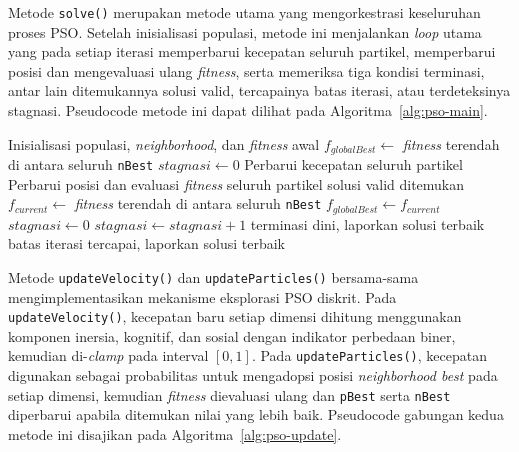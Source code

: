 Metode \texttt{solve()} merupakan metode utama yang mengorkestrasi keseluruhan proses PSO. Setelah inisialisasi populasi, metode ini menjalankan \textit{loop} utama yang pada setiap iterasi memperbarui kecepatan seluruh partikel, memperbarui posisi dan mengevaluasi ulang \textit{fitness}, serta memeriksa tiga kondisi terminasi, antar lain ditemukannya solusi valid, tercapainya batas iterasi, atau terdeteksinya stagnasi. Pseudocode metode ini dapat dilihat pada Algoritma~\ref{alg:pso-main}.

\begin{algorithm}[!htbp]
	\caption{Prosedur \texttt{solve} pada kelas \texttt{PSOSolver}}
	\label{alg:pso-main}
	\begin{algorithmic}[1]
		\State Inisialisasi populasi, \textit{neighborhood}, dan \textit{fitness} awal
		\State $f_{\textit{globalBest}} \gets$ \textit{fitness} terendah di antara seluruh \texttt{nBest}
		\State $stagnasi \gets 0$
		\State Perbarui kecepatan seluruh partikel
		\State Perbarui posisi dan evaluasi \textit{fitness} seluruh partikel
		\State \Return solusi valid ditemukan
		\EndIf
		\State $f_{\textit{current}} \gets$ \textit{fitness} terendah di antara seluruh \texttt{nBest}
		\State $f_{\textit{globalBest}} \gets f_{\textit{current}}$
		\State $stagnasi \gets 0$
		\Else
		\State $stagnasi \gets stagnasi + 1$
		\EndIf
		\State \Return terminasi dini, laporkan solusi terbaik
		\EndIf
		\EndFor
		\State \Return batas iterasi tercapai, laporkan solusi terbaik
		\EndFunction
	\end{algorithmic}
\end{algorithm}

Metode \texttt{updateVelocity()} dan \texttt{updateParticles()} bersama-sama mengimplementasikan mekanisme eksplorasi PSO diskrit. Pada \texttt{updateVelocity()}, kecepatan baru setiap dimensi dihitung menggunakan komponen inersia, kognitif, dan sosial dengan indikator perbedaan biner, kemudian di-\textit{clamp} pada interval $[0, 1]$. Pada \texttt{updateParticles()}, kecepatan digunakan sebagai probabilitas untuk mengadopsi posisi \textit{neighborhood best} pada setiap dimensi, kemudian \textit{fitness} dievaluasi ulang dan \texttt{pBest} serta \texttt{nBest} diperbarui apabila ditemukan nilai yang lebih baik. Pseudocode gabungan kedua metode ini disajikan pada Algoritma~\ref{alg:pso-update}.

